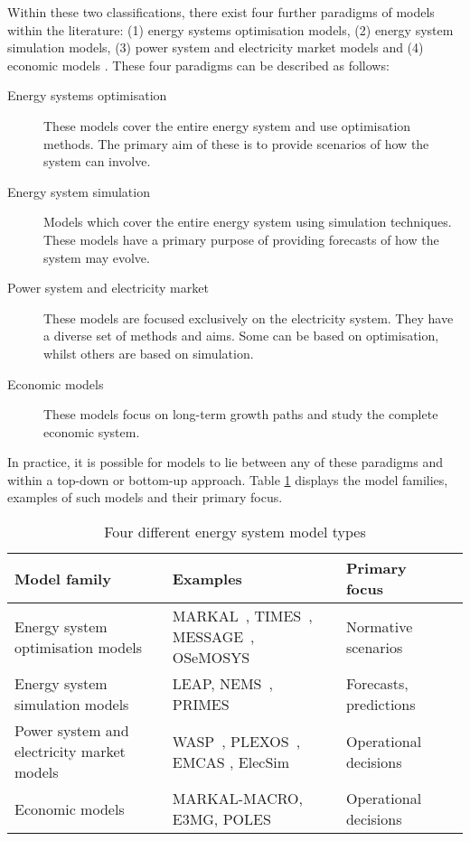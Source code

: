 Within these two classifications, there exist four further paradigms of models within the literature: (1) energy systems optimisation models, (2) energy system simulation models, (3) power system and electricity market models and (4) economic models \cite{Pfenninger2014b}. These four paradigms can be described as follows:

\begin{description}
	\item[Energy systems optimisation] These models cover the entire energy system and use optimisation methods. The primary aim of these is to provide scenarios of how the system can involve.
	\item[Energy system simulation] Models which cover the entire energy system using simulation techniques. These models have a primary purpose of providing forecasts of how the system may evolve.
	\item[Power system and electricity market] These models are focused exclusively on the electricity system. They have a diverse set of methods and aims. Some can be based on optimisation, whilst others are based on simulation.
	\item[Economic models] These models focus on long-term growth paths and study the complete economic system.
\end{description}

In practice, it is possible for models to lie between any of these paradigms and within a top-down or bottom-up approach. Table \ref{tab:litreview:modeltypes} displays the model families, examples of such models and their primary focus.


\begin{table}[]
	\footnotesize
	\begin{tabular}{p{5cm}p{7cm}ll@{}}
		\toprule
		Model family                               & Examples                                 & Primary focus                            \\ \midrule
		Energy system optimisation models          & MARKAL~\cite{Fishbone1981a}, TIMES~\cite{Giannakidis2013}, MESSAGE~\cite{Schrattenholzer1981}, OSeMOSYS~\cite{Howells2011a}        & Normative scenarios                      \\
		Energy system simulation models            & LEAP\cite{LEAP2012a}, NEMS~\cite{Grozev2005a}, PRIMES\cite{Capros2012}                       & Forecasts, predictions                   \\
		Power system and electricity market models & WASP~\cite{WASP2001}, PLEXOS~\cite{PLEXOS2013}, EMCAS \cite{Conzelmann}, ElecSim\cite{Kell}             & Operational decisions \\
		Economic models & MARKAL-MACRO, E3MG, POLES   & Operational decisions \\
		\bottomrule
	\end{tabular}
	\caption{Four different energy system model types \cite{Pfenninger2014b}}
	\label{tab:litreview:modeltypes}
\end{table}



